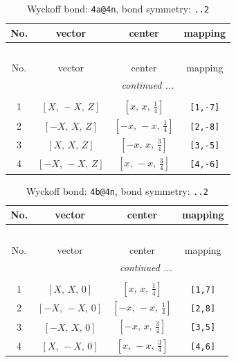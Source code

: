 \documentclass[fleqn,8pt]{jsarticle}
\begin{document}
\begin{longtable}{cccc}
\caption{Wyckoff bond: {\tt 4a@4n}, bond symmetry: {\tt ..2}}
 \\
 \hline \hline
No. & vector & center & mapping \\ \hline \endfirsthead

\multicolumn{3}{l}{\tablename\ \thetable{}} \\
 \hline \hline
No. & vector & center & mapping \\ \hline \endhead

 \hline \hline
\multicolumn{3}{r}{\footnotesize\it continued ...} \\ \endfoot

 \hline \hline
\multicolumn{3}{r}{} \\ \endlastfoot

1 & $\left[ X,\, - X,\, Z \right]$ & $\left[ x,\, x,\, \frac{1}{4} \right]$ & {\tt [1,-7]} \\ \hline
2 & $\left[ - X,\, X,\, Z \right]$ & $\left[ - x,\, - x,\, \frac{1}{4} \right]$ & {\tt [2,-8]} \\ \hline
3 & $\left[ X,\, X,\, Z \right]$ & $\left[ - x,\, x,\, \frac{3}{4} \right]$ & {\tt [3,-5]} \\ \hline
4 & $\left[ - X,\, - X,\, Z \right]$ & $\left[ x,\, - x,\, \frac{3}{4} \right]$ & {\tt [4,-6]} \\
\end{longtable}
\renewcommand{\arraystretch}{1.2}
\begin{longtable}{cccc}
\caption{Wyckoff bond: {\tt 4b@4n}, bond symmetry: {\tt ..2}}
 \\
 \hline \hline
No. & vector & center & mapping \\ \hline \endfirsthead

\multicolumn{3}{l}{\tablename\ \thetable{}} \\
 \hline \hline
No. & vector & center & mapping \\ \hline \endhead

 \hline \hline
\multicolumn{3}{r}{\footnotesize\it continued ...} \\ \endfoot

 \hline \hline
\multicolumn{3}{r}{} \\ \endlastfoot

1 & $\left[ X,\, X,\, 0 \right]$ & $\left[ x,\, x,\, \frac{1}{4} \right]$ & {\tt [1,7]} \\ \hline
2 & $\left[ - X,\, - X,\, 0 \right]$ & $\left[ - x,\, - x,\, \frac{1}{4} \right]$ & {\tt [2,8]} \\ \hline
3 & $\left[ - X,\, X,\, 0 \right]$ & $\left[ - x,\, x,\, \frac{3}{4} \right]$ & {\tt [3,5]} \\ \hline
4 & $\left[ X,\, - X,\, 0 \right]$ & $\left[ x,\, - x,\, \frac{3}{4} \right]$ & {\tt [4,6]} \\
\end{longtable}
\end{document}
